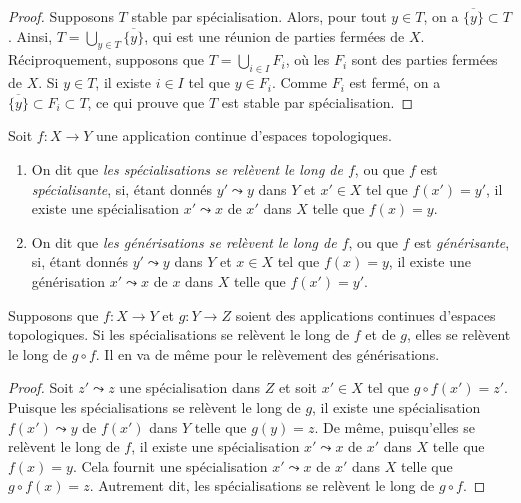 \begin{proof}
Supposons $T$ stable par spécialisation. Alors, pour tout $y\in T$, on a
$\overline{\{y\}} \subset T$. Ainsi,
$T = \bigcup_{y\in T} \overline{\{y\}}$, qui est une réunion de parties
fermées de $X$. Réciproquement, supposons que
$T = \bigcup_{i\in I}F_i$, où les $F_i$ sont des parties fermées de $X$.
Si $y\in T$, il existe $i\in I$ tel que $y\in F_i$. Comme $F_i$ est fermé,
on a $\overline{\{y\}} \subset F_i \subset T$, ce qui prouve que $T$ est
stable par spécialisation.
\end{proof}

\begin{definition}
\label{definition-lift-specializations}
Soit $f : X \to Y$ une application continue d'espaces topologiques.
\begin{enumerate}
\item On dit que {\it les spécialisations se relèvent le long de $f$}, ou que
$f$ est {\it spécialisante}, si, étant donnés $y' \leadsto y$ dans $Y$ et
$x'\in X$ tel que $f(x') = y'$, il existe une spécialisation
$x' \leadsto x$ de $x'$ dans $X$ telle que $f(x) = y$.
\item On dit que {\it les générisations se relèvent le long de $f$}, ou que
$f$ est {\it générisante}, si, étant donnés $y' \leadsto y$ dans $Y$ et
$x\in X$ tel que $f(x) = y$, il existe une générisation $x' \leadsto x$ de
$x$ dans $X$ telle que $f(x') = y'$.
\end{enumerate}
\end{definition}

\begin{lemma}
\label{lemma-lift-specialization-composition}
Supposons que $f : X \to Y$ et $g : Y \to Z$ soient des applications
continues d'espaces topologiques. Si les spécialisations se relèvent le long
de $f$ et de $g$, elles se relèvent le long de $g \circ f$. Il en va de même
pour le relèvement des générisations.
\end{lemma}

\begin{proof}
Soit $z'\leadsto z$ une spécialisation dans $Z$ et soit $x' \in X$ tel que
$g\circ f (x') = z'$. Puisque les spécialisations se relèvent le long de $g$,
il existe une spécialisation $f(x') \leadsto y$ de $f(x')$ dans $Y$ telle que
$g(y) = z$. De même, puisqu'elles se relèvent le long de $f$, il existe une
spécialisation $x' \leadsto x$ de $x'$ dans $X$ telle que $f(x) = y$. Cela
fournit une spécialisation $x' \leadsto x$ de $x'$ dans $X$ telle que
$g\circ f(x) = z$. Autrement dit, les spécialisations se relèvent le long de
$g\circ f$.
\end{proof}

